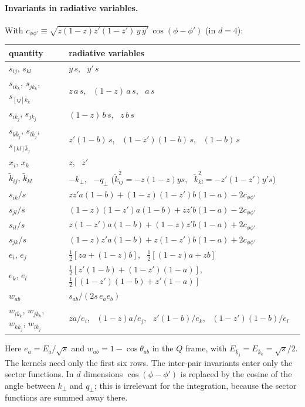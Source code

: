 \documentclass[11pt,a4paper]{article}
\newcommand{\jb}{\bar k_{j}}
\newcommand{\kb}{\bar k_{k}}
\begin{document}
\paragraph{Invariants in radiative variables.} With $c_{\phi\phi'}\equiv\sqrt{z(1-z)z'(1-z')\,y\,y'}\,\cos(\phi-\phi')$ (in $d=4$):
\begin{center}
\renewcommand{\arraystretch}{1.25}
\begin{tabular}{ll}\toprule
quantity & radiative variables\\\midrule
$s_{ij}$, $s_{kl}$ & $y\,s$, \ $y'\,s$\\
$s_{i\kb}$, $s_{j\kb}$, $s_{[ij]\kb}$ & $z\,a\,s$, \ $(1-z)\,a\,s$, \ $a\,s$\\
$s_{i\jb}$, $s_{j\jb}$ & $(1-z)\,b\,s$, \ $z\,b\,s$\\
$s_{k\jb}$, $s_{l\jb}$, $s_{[kl]\jb}$ & $z'(1-b)\,s$, \ $(1-z')(1-b)\,s$, \ $(1-b)\,s$\\
$x_i$, $x_k$ & $z$, \ $z'$\\
$\tilde k_{ij}$, $\tilde k_{kl}$ & $-k_\perp$, \ $-q_\perp$ \quad ($\tilde k_{ij}^2=-z(1-z)ys$, \ $\tilde k_{kl}^2=-z'(1-z')y's$)\\
$s_{ik}/s$ & $zz'a(1-b)+(1-z)(1-z')b(1-a)-2c_{\phi\phi'}$\\
$s_{jl}/s$ & $(1-z)(1-z')a(1-b)+zz'b(1-a)-2c_{\phi\phi'}$\\
$s_{il}/s$ & $z(1-z')a(1-b)+(1-z)z'b(1-a)+2c_{\phi\phi'}$\\
$s_{jk}/s$ & $(1-z)z'a(1-b)+z(1-z')b(1-a)+2c_{\phi\phi'}$\\
$e_i$, $e_j$ & $\frac12[za+(1-z)b]$, \ $\frac12[(1-z)a+zb]$\\
$e_k$, $e_l$ & $\frac12[z'(1-b)+(1-z')(1-a)]$, \ $\frac12[(1-z')(1-b)+z'(1-a)]$\\
$w_{ab}$ & $s_{ab}/(2s\,e_ae_b)$\\
$w_{i\kb}$, $w_{j\kb}$, $w_{k\jb}$, $w_{l\jb}$ & $za/e_i$, \ $(1-z)a/e_j$, \ $z'(1-b)/e_k$, \ $(1-z')(1-b)/e_l$\\\bottomrule
\end{tabular}
\end{center}
Here $e_a=E_a/\sqrt s$ and $w_{ab}=1-\cos\theta_{ab}$ in the $Q$ frame, with $E_{\jb}=E_{\kb}=\sqrt s/2$.
The kernels need only the first six rows. The inter-pair invariants enter only the sector functions. In $d$ dimensions
$\cos(\phi-\phi')$ is replaced by the cosine of the angle between $k_\perp$ and $q_\perp$; this is irrelevant for the integration,
because the sector functions are summed away there.
\end{document}
